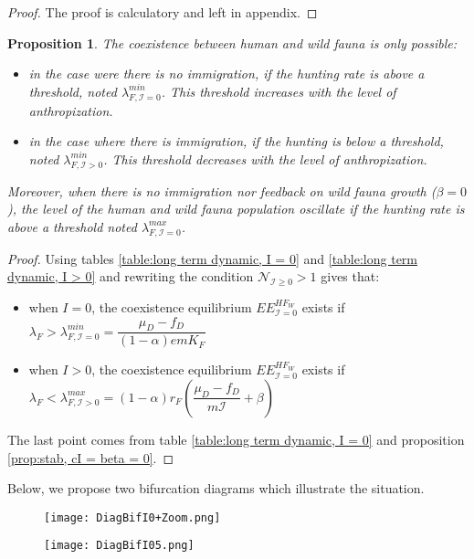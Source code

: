 \documentclass{article}
\newcommand{\lfw}{\lambda_{F}}
\newcommand{\lfw}{\lambda_{F}}
\newcommand{\cI}{\mathcal{I}}
\newtheorem{prop}{Proposition}
\begin{document}
\begin{proof}
The proof is calculatory and left in appendix.
\end{proof}

\begin{prop}
The coexistence between human and wild fauna is only possible:
\begin{itemize}
\item in the case were there is no immigration, if the hunting rate is above a threshold, noted $\lambda_{F, \cI = 0}^{min}$. This threshold increases with the level of anthropization.
\item in the case where there is immigration, if the hunting is below a threshold, noted  $\lambda_{F, \cI > 0}^{min}$. This threshold decreases with the level of anthropization.
\end{itemize}

Moreover, when there is no immigration nor feedback on wild fauna growth ($\beta = 0$), the level of the human and wild fauna population oscillate if the hunting rate is above a threshold noted $\lambda_{F, \cI = 0}^{max}$.
\end{prop}

\begin{proof}
Using tables \ref{table:long term dynamic, I = 0} and \ref{table:long term dynamic, I > 0} and rewriting the condition $\mathcal{N}_{\cI \geq 0} > 1$ gives that:
\begin{itemize}
\item when $I = 0$, the coexistence equilibrium $EE^{HF_W}_{\cI = 0}$ exists if $\lfw > \lambda_{F, \cI = 0}^{min} = \dfrac{\mu_D - f_D}{(1-\alpha) e m K_F}$
\item when $I > 0$, the coexistence equilibrium $EE^{HF_W}_{\cI = 0}$ exists if $\lfw < \lambda_{F, \cI > 0}^{max} = (1-\alpha) r_F\left(\dfrac{\mu_D - f_D}{m \cI} + \beta \right)$
\end{itemize}
The last point comes from table \ref{table:long term dynamic, I = 0} and proposition \ref{prop:stab, cI = beta = 0}.
\end{proof}

Below, we propose two bifurcation diagrams which illustrate the situation. 

\begin{figure}[!ht]
\centering
\texttt{[image: DiagBifI0+Zoom.png]}
\end{figure}

\begin{figure}[!ht]
\centering
\texttt{[image: DiagBifI05.png]}
\end{figure}
\end{document}
